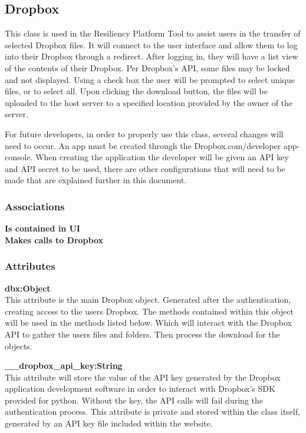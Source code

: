 \subsection{Dropbox}
This class is used in the Resiliency Platform Tool to assist users in the transfer of selected Dropbox files.
It will connect to the user interface and allow them to log into their Dropbox through a redirect. After logging
in, they will have a list view of the contents of their Dropbox. Per Dropbox's API, some files may be locked and 
not displayed. Using a check box the user will be prompted to select unique files, or to select all. Upon clicking 
the download button, the files will be uploaded to the host server to a specified location provided by the owner of
the server.

For future developers, in order to properly use this class, several changes will need to occur. An app must be created
through the Dropbox.com/developer app-console. When creating the application the developer will be given an API key and 
API secret to be used, there are other configurations that will need to be made that are explained further in this document. 

\subsubsection{Associations}
\textbf{Is contained in UI} \\

\textbf{Makes calls to Dropbox} \\

\subsubsection{Attributes}
\textbf{dbx:Object} \\
    This attribute is the main Dropbox object. Generated after the authentication, creating access to the users Dropbox. The methods contained 
    within this object will be used in the methods listed below. Which will interact with the Dropbox API to gather the users files and folders.
    Then process the download for the objects. 

\textbf{\_\_dropbox\_api\_key:String} \\
    This attribute will store the value of the API key generated by the Dropbox application development software 
    in order to interact with Dropbox's SDK provided for python. Without the key, the API calls will fail during 
    the authentication process. This attribute is private and stored within the class itself, generated by an API
    key file included within the website.

